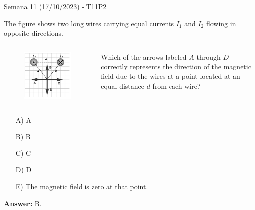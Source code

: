 \begin{frame}{Semana 11 (17/10/2023) - T11P2}
    
    The figure shows two long wires carrying equal currents $I_1$ and $I_2$ flowing in opposite directions.
    
    \begin{columns}
    \begin{figure}
        \centering
        \includegraphics[scale=0.4]{figures/t9p2.png}
    \end{figure}
    Which of the arrows labeled $A$ through $D$ correctly represents the direction of the magnetic field due to the wires at a point located at an equal distance $d$ from each wire?
    \end{columns}
    
    
    \begin{itemize}
        \item[A)] A
        \item[B)] B
        \item[C)] C
        \item[D)] D
        \item[E)] The magnetic field is zero at that point.
    \end{itemize}
    
     \pause \centering \textbf{Answer:} B.
    
\end{frame}

